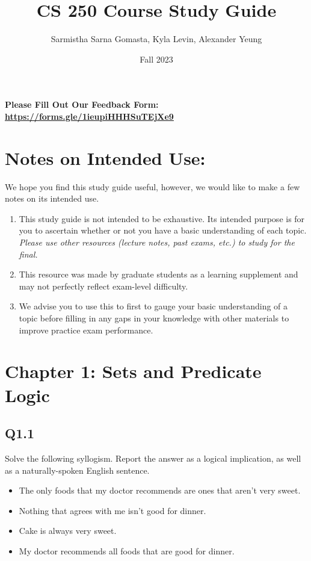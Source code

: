 \documentclass{article}
\title{CS 250 Course Study Guide}
\author{Sarmistha Sarna Gomasta, Kyla Levin, Alexander Yeung}
\date{Fall 2023}
\begin{document}
\maketitle
\begin{center}
    \textbf{Please Fill Out Our Feedback Form: \href{https://forms.gle/1ieupiHHHSuTEjXe9}{https://forms.gle/1ieupiHHHSuTEjXe9}}
\end{center}
\section*{Notes on Intended Use:}
We hope you find this study guide useful, however, we would like to make a few notes on its intended use. 
\begin{center}
    \begin{enumerate}
        \item This study guide is not intended to be exhaustive. Its intended purpose is for you to ascertain whether or not you have a basic understanding of each topic. \textit{Please use other resources (lecture notes, past exams, etc.) to study for the final.}
        \item This resource was made by graduate students as a learning supplement and may not perfectly reflect exam-level difficulty.
        \item We advise you to use this to first to gauge your basic understanding of a topic before filling in any gaps in your knowledge with other materials to improve practice exam performance.
    \end{enumerate}
    
\end{center}

\tableofcontents
\newpage



\section*{Chapter 1: Sets and Predicate Logic}
\subsection*{Q1.1}
Solve the following syllogism. Report the answer as a logical implication, as well as a naturally-spoken English sentence.
\begin{itemize}
    \item The only foods that my doctor recommends are ones that aren't very sweet.
    \item Nothing that agrees with me isn't good for dinner.
    \item Cake is always very sweet.
    \item My doctor recommends all foods that are good for dinner.
\end{itemize}
\newpage
\end{document}
